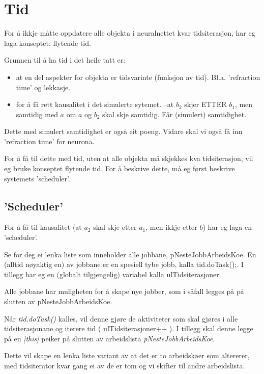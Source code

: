 \section{Tid}

For å ikkje måtte oppdatere alle objekta i neuralnettet kvar tidsiterasjon, har eg laga konseptet: flytende tid.

Grunnen til å ha tid i det heile tatt er:
\begin{itemize}
	\item at en del aspekter for objekta er tidsvarinte (funksjon av tid). Bl.a. 'refraction time' og lekkasje.
	\item for å få rett kausalitet i det simulerte sytemet. --at  $b_2$ skjer ETTER $b_1$, men samtidig med $a$ om $a$ og $b_2$ skal skje samtidig. Får (simulert) samtidighet.
\end{itemize}

Dette med simulert samtidighet er også eit poeng. Vidare skal vi også få inn 'refraction time' for neurona. %

For å få til dette med tid, uten at alle objekta må skjekkes kva tidsiterasjon, vil eg bruke konseptet flytende tid. For å beskrive dette, må eg først beskrive systemets 'scheduler'.

\subsection{'Scheduler'}
For å få til kausalitet (at $a_2$ skal skje etter $a_1$, men ikkje etter $b$) har eg laga en 'scheduler'. 

Se for deg ei lenka liste som inneholder alle jobbane, pNesteJobbArbeidsKoe. En (alltid nøyaktig en) av jobbane er en spesiell tybe jobb, kalla tid.doTask();. I tillegg har eg en (globalt tilgjengelig) variabel kalla ulTidsiterasjoner.

Alle jobbane har muligheten for å skape nye jobber, som i såfall legges på på slutten av pNesteJobbArbeidsKoe.

Når \emph{tid.doTask()} kalles, vil denne gjøre de aktiviteter som skal gjøres i alle tidsiterasjonane og iterere tid ( ulTidsiterasjoner++ ).
I tillegg skal denne legge på en \emph{[this]} peiker på slutten av arbeidslista \emph{pNesteJobbArbeidsKoe}.

Dette vil skape en lenka liste variant av at det er to arbeidskøer som altererer, med tidsiterator kvar gang ei av de er tom og vi skifter til andre arbeidslista.



